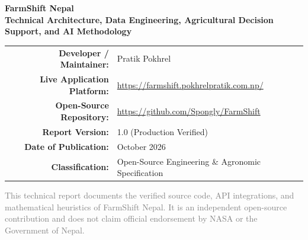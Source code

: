 \documentclass[11pt,a4paper]{report}
\begin{document}
\begin{titlepage}
\begin{center}
\vspace*{1.0cm}

{\Huge \bfseries \textcolor{primarygreen}{FarmShift Nepal}}\\[0.5cm]
{\Large \bfseries \textcolor{darkcharcoal}{Technical Architecture, Data Engineering, Agricultural Decision Support, and AI Methodology}}\\[1.2cm]


\vspace{1.8cm}

\begin{tabular}{rl}
\textbf{Developer / Maintainer:} & Pratik Pokhrel \\
\textbf{Live Application Platform:} & \url{https://farmshift.pokhrelpratik.com.np/} \\
\textbf{Open-Source Repository:} & \url{https://github.com/Spongly/FarmShift} \\
\textbf{Report Version:} & 1.0 (Production Verified) \\
\textbf{Date of Publication:} & October 2026 \\
\textbf{Classification:} & Open-Source Engineering \& Agronomic Specification \\
\end{tabular}

\vfill


\vspace{0.4cm}
{\footnotesize \textcolor{gray}{This technical report documents the verified source code, API integrations, and mathematical heuristics of FarmShift Nepal. It is an independent open-source contribution and does not claim official endorsement by NASA or the Government of Nepal.}}

\end{center}
\end{titlepage}
\end{document}
